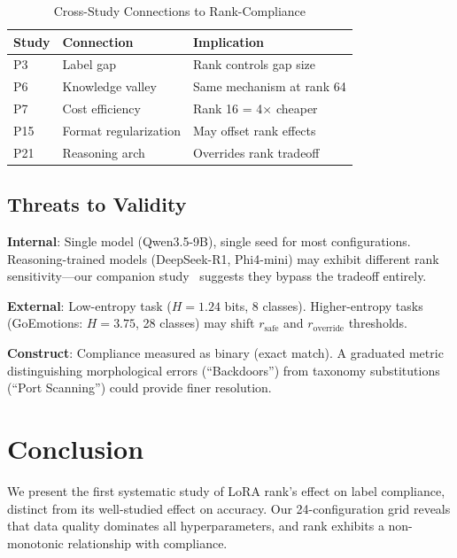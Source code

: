 \documentclass[journal]{IEEEtran}
\begin{document}
\begin{table}[!ht]
\centering
\caption{Cross-Study Connections to Rank-Compliance}
\label{tab:connections}
\begin{tabular}{lll}
\toprule
\textbf{Study} & \textbf{Connection} & \textbf{Implication} \\
\midrule
P3~\cite{p3} & Label gap & Rank controls gap size \\
P6~\cite{p6} & Knowledge valley & Same mechanism at rank 64 \\
P7~\cite{p7} & Cost efficiency & Rank 16 = 4$\times$ cheaper \\
P15~\cite{p15} & Format regularization & May offset rank effects \\
P21~\cite{p21} & Reasoning arch & Overrides rank tradeoff \\
\bottomrule
\end{tabular}
\end{table}

\subsection{Threats to Validity}
\textbf{Internal}: Single model (Qwen3.5-9B), single seed for most configurations. Reasoning-trained models (DeepSeek-R1, Phi4-mini) may exhibit different rank sensitivity---our companion study~\cite{p21} suggests they bypass the tradeoff entirely.

\textbf{External}: Low-entropy task ($H = 1.24$ bits, 8 classes). Higher-entropy tasks (GoEmotions: $H = 3.75$, 28 classes) may shift $r_\text{safe}$ and $r_\text{override}$ thresholds.

\textbf{Construct}: Compliance measured as binary (exact match). A graduated metric distinguishing morphological errors (``Backdoors'') from taxonomy substitutions (``Port Scanning'') could provide finer resolution.

\section{Conclusion}

We present the first systematic study of LoRA rank's effect on label compliance, distinct from its well-studied effect on accuracy. Our 24-configuration grid reveals that data quality dominates all hyperparameters, and rank exhibits a non-monotonic relationship with compliance.
\end{document}
